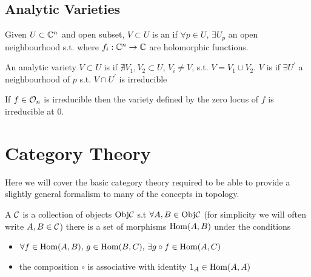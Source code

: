 \documentclass{article}
\begin{document}
\subsection{Analytic Varieties}

\begin{definition}
	Given $U \subset \mathbb{C}^n$ and open subset, $V \subset U$ is an  if $\forall p \in U, \, \exists U_p$ an open neighbourhood s.t. 
where $f_i : \mathbb{C}^n \to \mathbb{C}$ are holomorphic functions. 
\end{definition}

\begin{definition}
	An analytic variety $V \subset U$ is  if $\nexists V_1, V_2 \subset U$, $V_i \neq V$, s.t. $V = V_1 \cup V_2$. $V$ is  if $\exists U^\prime$ a neighbourhood of $p$ s.t. $V\cap U^\prime$ is irreducible  
\end{definition}

\begin{prop}
	If $f \in \mathcal{O}_n$ is irreducible then the variety defined by the zero locus of $f$ is irreducible at 0.
\end{prop}


\section{Category Theory}
Here we will cover the basic category theory required to be able to provide a slightly general formalism to many of the concepts in topology. 

\begin{definition}
	A  $\mathcal{C}$ is a collection of objects $\text{Obj}\mathcal{C}$ s.t $\forall A,B \in  \text{Obj}\mathcal{C}$ (for simplicity we will often write $A,B \in \mathcal{C}$) there is a set of morphisms $\operatorname{Hom}(A,B)$ under the conditions
	\begin{itemize}
		\item $\forall f \in \operatorname{Hom}(A,B), \, g \in \operatorname{Hom}(B,C), \, \exists g \circ f \in \operatorname{Hom}(A,C)$
		\item the composition $\circ$ is associative with identity $1_A \in \operatorname{Hom}(A,A)$
	\end{itemize}
\end{definition}
\end{document}
